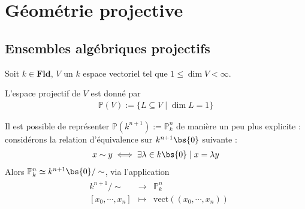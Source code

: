 \chapter{Géométrie projective}
    \section{Ensembles algébriques projectifs}
        Soit $k \in \mathbf{Fld}$, $V$ un $k$ espace vectoriel tel que $1 \leq \dim V < \infty$.
        \begin{defi}
            L'espace projectif de $V$ est donné par
            \begin{align*}
                \mathbb{P}(V) := \{L \subseteq V \mid \dim L = 1\}
            \end{align*}
        \end{defi}
        Il est possible de représenter $\mathbb{P}(k^{n+1}) := \mathbb{P}^n_k$ de manière un peu plus explicite : considérons la relation d'équivalence sur $k^{n+1} \bs \{0\}$ suivante : 
        \begin{align*}
            x \sim y \iff \exists \lambda \in k \bs \{0\} \mid x = \lambda y
        \end{align*}
        Alors $\mathbb{P}^n_k \simeq k^{n+1} \bs \{0\} /\sim$, via l'application
        \begin{align*}
            \begin{array}{cccc}
                & k^{n+1}/\sim & \to & \mathbb{P}^n_k \\
                & [x_0, \cdots, x_n] & \mapsto & \mathrm{vect}((x_0, \cdots, x_n))\\
            \end{array}
        \end{align*}
